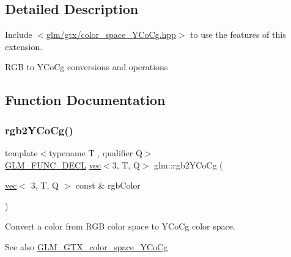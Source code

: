 \subsection{Detailed Description}
Include $<$\hyperlink{color__space___y_co_cg_8hpp}{glm/gtx/color\+\_\+space\+\_\+\+Y\+Co\+Cg.\+hpp}$>$ to use the features of this extension.

R\+GB to Y\+Co\+Cg conversions and operations 

\subsection{Function Documentation}
\mbox{\label{group__gtx__color__space___y_co_cg_ga0606353ec2a9b9eaa84f1b02ec391bc5}} 
\subsubsection{\texorpdfstring{rgb2\+Y\+Co\+Cg()}{rgb2YCoCg()}}
{\footnotesize\ttfamily template$<$typename T , qualifier Q$>$ \\
\hyperlink{setup_8hpp_ab2d052de21a70539923e9bcbf6e83a51}{G\+L\+M\+\_\+\+F\+U\+N\+C\+\_\+\+D\+E\+CL} \hyperlink{structglm_1_1vec}{vec}$<$3, T, Q$>$ glm\+::rgb2\+Y\+Co\+Cg (\begin{DoxyParamCaption}\item[{\hyperlink{structglm_1_1vec}{vec}$<$ 3, T, Q $>$ const \&}]{rgb\+Color }\end{DoxyParamCaption})}

Convert a color from R\+GB color space to Y\+Co\+Cg color space. \begin{DoxySeeAlso}{See also}
\hyperlink{group__gtx__color__space___y_co_cg}{G\+L\+M\+\_\+\+G\+T\+X\+\_\+color\+\_\+space\+\_\+\+Y\+Co\+Cg} 
\end{DoxySeeAlso}
\mbox{\label{group__gtx__color__space___y_co_cg_ga0389772e44ca0fd2ba4a79bdd8efe898}} 
